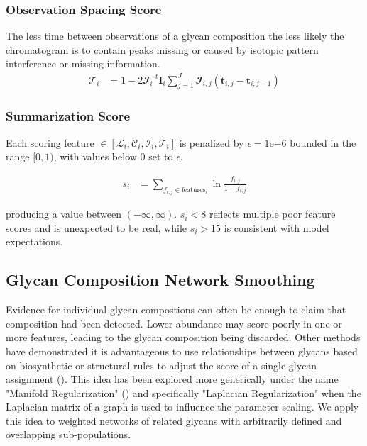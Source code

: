     \subsubsection{Observation Spacing Score}
        The less time between observations of a glycan composition the less likely the chromatogram
        is to contain peaks missing or caused by isotopic pattern interference or missing information.
        \begin{align}
            \mathscr{T}_i &= 1 - 2\mathbfcal{I}_i^{-t}\mathbf{I}_i\sum_{j=1}^J\mathbfcal{I}_{i, j}(
                \mathbf{t}_{i, j} - \mathbf{t}_{i, j - 1})
        \end{align}

    \subsubsection{Summarization Score}
        Each scoring feature $\in \left[\mathscr{L}_i, \mathscr{C}_i, \mathscr{I}_i,
        \mathscr{T}_i\right]$ is penalized by $\epsilon = 1\mathrm{e}{-6}$ bounded in
        the range $[0, 1)$, with values below 0 set to $\epsilon$.

        \begin{align}
            s_i &= \sum_{f_{i,j} \in \text{features}_i}{\ln{
                \frac{f_{i, j}}{1 - f_{i, j}}
                }
            }
        \end{align}

        \noindent producing a value between $(-\infty, \infty)$. $s_i < 8$ reflects multiple
        poor feature scores and is unexpected to be real, while $s_i > 15$ is
        consistent with model expectations.

\subsection{Glycan Composition Network Smoothing}
    Evidence for individual glycan compostions can often be enough to claim that
    composition had been detected. Lower abundance may score poorly in one or
    more features, leading to the glycan composition being discarded. Other
    methods have demonstrated it is advantageous to use relationships between
    glycans based on biosynthetic or structural rules to adjust the score of a
    single glycan assignment (\cite{Goldberg2009, Kronewitter2014}). This idea
    has been explored more generically under the name "Manifold Regularization"
    (\cite{Belkin2006}) and specifically "Laplacian Regularization" when the
    Laplacian matrix of a graph is used to influence the parameter scaling. We
    apply this idea to weighted networks of related glycans with arbitrarily
    defined and overlapping sub-populations.

